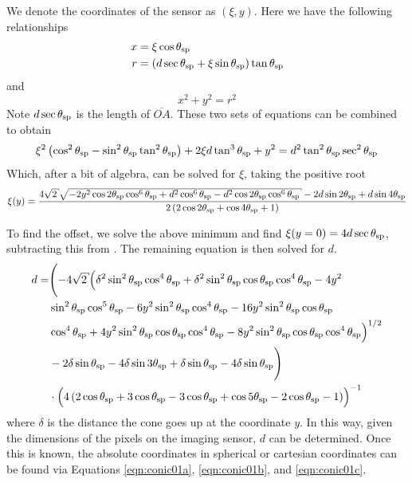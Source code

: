 We denote the coordinates of the sensor as $(\xi,y)$.  Here we have the
following relationships
\begin{align}
x &= \xi \cos \theta_\mathrm{sp}\\
\label{eqn:conic01a}
r &= \left(d \sec \theta_\mathrm{sp} + \xi \sin \theta_\mathrm{sp}\right) \tan\theta_\mathrm{sp}
\label{eqn:conic01b}
\end{align}
and
\begin{equation}
x^2+y^2=r^2
\label{eqn:conic01c}
\end{equation}
Note $d \sec\theta_\mathrm{sp}$ is the length of $\overline{OA}$.  These two sets of
equations can be combined to obtain
\begin{equation}
\xi^2 \left(\cos ^2\theta_\mathrm{sp}-\sin ^2\theta_\mathrm{sp} \tan
^2\theta_\mathrm{sp}\right)+2 \xi d \tan ^3\theta_\mathrm{sp}+y^2=d^2 \tan
^2\theta_\mathrm{sp} \sec ^2\theta_\mathrm{sp}
\end{equation}
Which, after a bit of algebra, can be solved for $\xi$, taking
the positive root
\begin{equation}
\xi(y) = \frac{4 \sqrt{2} \sqrt{-2 y^2 \cos 2 \thetasp  \cos ^6\thetasp +d^2
\cos ^6\thetasp -d^2 \cos 2 \thetasp  \cos^6\thetasp}-2 d \sin 2 \thetasp
+d \sin 4 \thetasp }{2 \left(2 \cos 2 \thetasp +\cos 4 \thetasp +1\right)}
\label{eqn:conic02}
\end{equation}

To find the offset, we solve the above minimum and find $\xi(y=0) = 4 d
\sec\theta_\mathrm{sp}$, subtracting this from .  The remaining
equation is then solved for $d$.
\begin{align}
d =& \Biggl(-4 \sqrt{2} \Bigl(\delta^2 \sin ^2\thetasp \cos
^4\thetasp+\delta^2 \sin ^2\thetasp \cos \thetasp \cos ^4\thetasp-4 y^2 \nonumber \\
   & \sin ^2\thetasp \cos ^5\thetasp-6 y^2 \sin ^2\thetasp
     \cos ^4\thetasp-16 y^2 \sin ^2\thetasp \cos \thetasp \nonumber \\
  & \cos ^4\thetasp+4 y^2 \sin ^2\thetasp \cos \thetasp
    \cos ^4\thetasp-8 y^2 \sin ^2\thetasp \cos \thetasp \cos
    ^4\thetasp\Bigr)^{1/2} \nonumber \\
&-2 \delta\sin \thetasp-4 \delta \sin 3 \thetasp+\delta  \sin \thetasp-4 \delta \sin \thetasp\Biggr) \nonumber \\
&\cdot\Bigl(4 \left(2 \cos \thetasp+3 \cos \thetasp-3 \cos \thetasp+\cos 5 \thetasp-2 \cos \thetasp-1\right)\Bigr)^{-1}
\end{align}
where $\delta$ is the distance the cone goes up at the coordinate $y$.  
In this way, given the dimensions of the pixels on the imaging sensor, $d$
can be determined.  Once this is known, the absolute coordinates in
spherical or cartesian coordinates can be found via Equations
\ref{eqn:conic01a}, \ref{eqn:conic01b}, and \ref{eqn:conic01c}.
